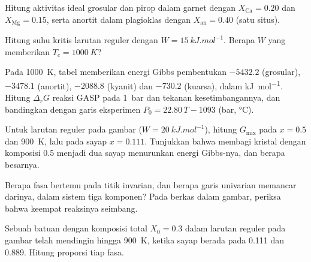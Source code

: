 \begin{exercise}[$\star$]\label{exo:b3:petrological-thermodynamics:3}
Hitung aktivitas ideal grosular dan pirop dalam garnet dengan
$X_{\text{Ca}} = 0.20$ dan $X_{\text{Mg}} = 0.15$, serta anortit dalam
plagioklas dengan $X_{\text{an}} = 0.40$ (satu situs).
\end{exercise}

\begin{exercise}[$\star$]\label{exo:b3:petrological-thermodynamics:4}
Hitung suhu kritis larutan reguler dengan $W =
\qty{15}{kJ.mol^{-1}}$. Berapa $W$ yang memberikan $T_c = \qty{1000}{K}$?
\end{exercise}

\begin{exercise}[$\star\star$]\label{exo:b3:petrological-thermodynamics:5}
Pada \qty{1000}{K}, tabel memberikan energi Gibbs pembentukan
$-5432.2$ (grosular), $-3478.1$ (anortit), $-2088.8$ (kyanit) dan $-730.2$
(kuarsa), dalam \unit{kJ.mol^{-1}}. Hitung $\Delta_rG$ reaksi GASP pada
\qty{1}{bar} dan tekanan kesetimbangannya, dan bandingkan dengan
garis eksperimen $P_0 = 22.80\,T - 1093$ (bar, \unit{\celsius}).
\end{exercise}

\begin{exercise}[$\star\star$]\label{exo:b3:petrological-thermodynamics:6}
Untuk larutan reguler pada gambar ($W = \qty{20}{kJ.mol^{-1}}$), hitung
$G_{\text{mix}}$ pada $x = 0.5$ dan \qty{900}{K}, lalu pada sayap  $x =
0.111$. Tunjukkan bahwa membagi kristal dengan komposisi 0.5 menjadi dua sayap
menurunkan energi Gibbs-nya, dan berapa besarnya.
\end{exercise}

\begin{exercise}[$\star\star$]\label{exo:b3:petrological-thermodynamics:7}
Berapa fasa bertemu pada titik invarian, dan berapa garis univarian
memancar darinya, dalam sistem tiga komponen? Pada berkas dalam gambar,
periksa bahwa keempat reaksinya seimbang.
\end{exercise}

\begin{exercise}[$\star\star$]\label{exo:b3:petrological-thermodynamics:8}
Sebuah batuan dengan komposisi total $X_0 = 0.3$ dalam larutan reguler pada gambar
telah mendingin hingga \qty{900}{K}, ketika sayap  berada pada 0.111 dan 0.889.
Hitung proporsi tiap fasa.
\end{exercise}

